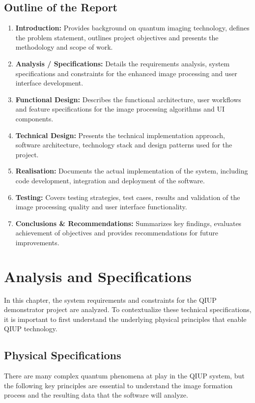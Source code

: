 \documentclass[12pt,a4paper]{article}
\begin{document}
    \subsection{Outline of the Report}
    \begin{enumerate}
        \item \textbf{Introduction:} Provides background on quantum imaging technology, defines the problem statement, outlines project objectives and presents the methodology and scope of work.
        \item \textbf{Analysis / Specifications:} Details the requirements analysis, system specifications and constraints for the enhanced image processing and user interface development.
        \item \textbf{Functional Design:} Describes the functional architecture, user workflows and feature specifications for the image processing algorithms and UI components.
        \item \textbf{Technical Design:} Presents the technical implementation approach, software architecture, technology stack and design patterns used for the project.
        \item \textbf{Realisation:} Documents the actual implementation of the system, including code development, integration and deployment of the software.
        \item \textbf{Testing:} Covers testing strategies, test cases, results and validation of the image processing quality and user interface functionality.
        \item \textbf{Conclusions \& Recommendations:} Summarizes key findings, evaluates achievement of objectives and provides recommendations for future improvements.
    \end{enumerate}

\newpage

\section{Analysis and Specifications}
    In this chapter, the system requirements and constraints for the \ac{QIUP} demonstrator project are analyzed. To contextualize these technical specifications, it is important to first understand the underlying physical principles that enable \ac{QIUP} technology.
        
    \subsection{Physical Specifications}
    There are many complex quantum phenomena at play in the \ac{QIUP} system, but the following key principles are essential to understand the image formation process and the resulting data that the software will analyze.
        
\end{document}
